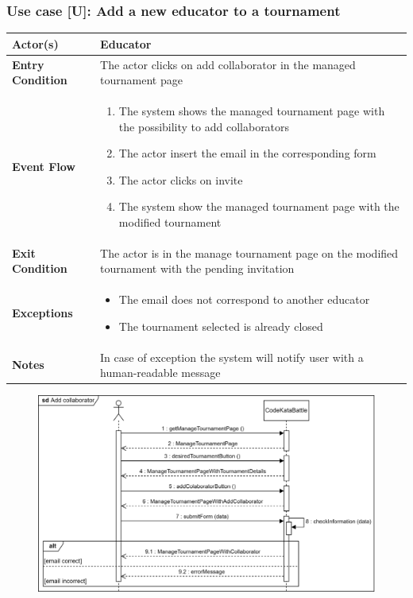 \documentclass[12pt, a4paper]{report}
\newcounter{useCase}
\newcommand{\usecase}[9]{
    \def\arraystretch{1.5} 
    \subsubsection*{Use case [U#2]: #3}
    \vspace*{0.2cm}
    \begin{center}
        \begin{tabular}{|l|p{12cm}|}
            \hline
            \textbf{Actor(s)} & #4 \\
            \hline
            \textbf{Entry Condition} & #5 \\
            \hline
            \textbf{Event Flow} & #6 \\
            \hline
            \textbf{Exit Condition} & #7 \\
            \hline
            \textbf{Exceptions} & #8 \\
            \hline
            \textbf{Notes} & #9 \\
            \hline
        \end{tabular}
    \end{center}
    #1
}
\begin{document}
    \usecase{\begin{figure}[H]\centering\includegraphics[width=0.9\linewidth]{images/addcollaborator.png}\end{figure}}        
    {\arabic{useCase}\stepcounter{useCase}}
    {Add a new educator to a tournament}
    {Educator}
    {The actor clicks on add collaborator in the managed tournament page}
    {
    \begin{enumerate}
        \item The system shows the managed tournament page with the possibility to add collaborators
        \item The actor insert the email in the corresponding form
        \item The actor clicks on invite
        \item The system show the managed tournament page with the modified tournament
    \end{enumerate}
    }
    {The actor is in the manage tournament page on the modified tournament with the pending invitation}
    {
    \begin{itemize}
        \item The email does not correspond to another educator 
        \item The tournament selected is already closed 
    \end{itemize}
    }
    {In case of exception the system will notify user with a human-readable message}
\end{document}
